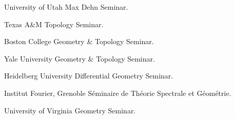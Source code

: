 {University of Utah}
{Max Dehn Seminar.}
{}

{Texas A\&M}
{Topology Seminar.}
{}

{Boston College}
{Geometry \& Topology Seminar.}
{}

{Yale University}
{Geometry \& Topology Seminar.}
{}

{Heidelberg University}
{Differential Geometry Seminar.}
{}

{Institut Fourier, Grenoble}
{S\'eminaire de Th\'eorie Spectrale et G\'eom\'etrie.}
{}

{University of Virginia}
{Geometry Seminar.}
{}


